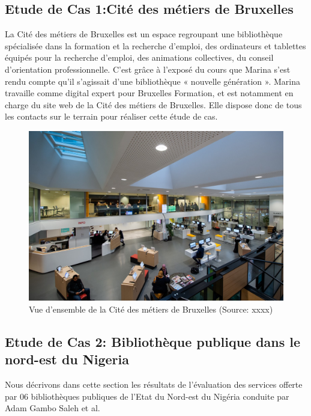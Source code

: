 \documentclass[french,a4paper,12pt]{article}
\begin{document}
\subsection{Etude de Cas 1:Cité des métiers de Bruxelles }
\quad La Cité des métiers de Bruxelles est un espace regroupant une bibliothèque spécialisée dans la formation et la recherche d’emploi, des ordinateurs et tablettes équipés pour la recherche d’emploi, des animations collectives, du conseil d’orientation professionnelle. C’est grâce à l’exposé du cours que Marina s’est rendu compte qu’il s’agissait d’une bibliothèque « nouvelle génération ». Marina travaille comme digital expert pour Bruxelles Formation, et est notamment en charge du site web de la Cité des métiers de Bruxelles. Elle dispose donc de tous les contacts sur le terrain pour réaliser cette étude de cas.
\begin{figure}[h]
\begin{center}

\includegraphics[scale=1]{imarina.JPG}
\caption{Vue d'ensemble de la Cité des métiers de Bruxelles (Source: xxxx)}
\end{center}
\end{figure}


\newpage
\subsection{Etude de Cas 2: Bibliothèque publique dans le nord-est du Nigeria \citep{Saleh}}
\quad Nous décrivons dans cette section les résultats de l’évaluation des services offerte par 06 bibliothèques publiques de l’Etat du Nord-est du Nigéria conduite par Adam Gambo Saleh et al. \\
\end{document}
